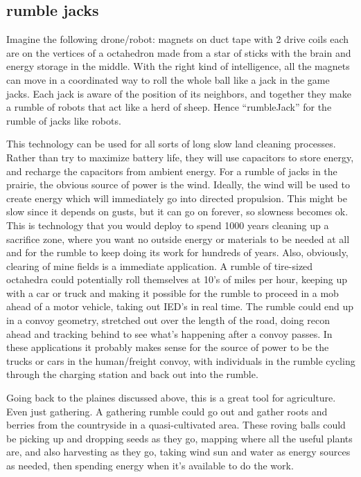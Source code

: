 \subsection{rumble jacks}\label{rumble-jacks}

Imagine the following drone/robot: magnets on duct tape with 2 drive
coils each are on the vertices of a octahedron made from a star of
sticks with the brain and energy storage in the middle. With the right
kind of intelligence, all the magnets can move in a coordinated way to
roll the whole ball like a jack in the game jacks. Each jack is aware of
the position of its neighbors, and together they make a rumble of robots
that act like a herd of sheep. Hence ``rumbleJack'' for the rumble of
jacks like robots.

This technology can be used for all sorts of long slow land cleaning
processes. Rather than try to maximize battery life, they will use
capacitors to store energy, and recharge the capacitors from ambient
energy. For a rumble of jacks in the prairie, the obvious source of
power is the wind. Ideally, the wind will be used to create energy which
will immediately go into directed propulsion. This might be slow since
it depends on gusts, but it can go on forever, so slowness becomes ok.
This is technology that you would deploy to spend 1000 years cleaning up
a sacrifice zone, where you want no outside energy or materials to be
needed at all and for the rumble to keep doing its work for hundreds of
years. Also, obviously, clearing of mine fields is a immediate
application. A rumble of tire-sized octahedra could potentially roll
themselves at 10's of miles per hour, keeping up with a car or truck and
making it possible for the rumble to proceed in a mob ahead of a motor
vehicle, taking out IED's in real time. The rumble could end up in a
convoy geometry, stretched out over the length of the road, doing recon
ahead and tracking behind to see what's happening after a convoy passes.
In these applications it probably makes sense for the source of power to
be the trucks or cars in the human/freight convoy, with individuals in
the rumble cycling through the charging station and back out into the
rumble.

Going back to the plaines discussed above, this is a great tool for
agriculture. Even just gathering. A gathering rumble could go out and
gather roots and berries from the countryside in a quasi-cultivated
area. These roving balls could be picking up and dropping seeds as they
go, mapping where all the useful plants are, and also harvesting as they
go, taking wind sun and water as energy sources as needed, then spending
energy when it's available to do the work.

